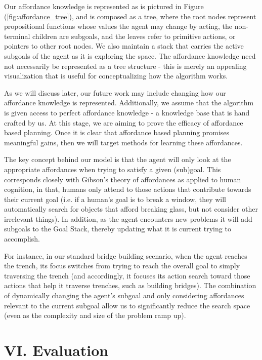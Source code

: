 \documentclass[a4paper]{article}
\begin{document}
Our affordance knowledge is represented as is pictured in Figure (\ref{fig:affordance_tree}), and is composed as a tree, where the root nodes represent propositional functions whose values the agent may change by acting, the non-terminal children are subgoals, and the leaves refer to primitive actions, or pointers to other root nodes. We also maintain a stack that carries the active subgoals of the agent as it is exploring the space. The affordance knowledge need not necessarily be represented as a tree structure - this is merely an appealing visualization that is useful for conceptualizing how the algorithm works.

As we will discuss later, our future work may include changing how our affordance knowledge is represented. Additionally, we assume that the algorithm is given access to perfect affordance knowledge - a knowledge base that is hand crafted by us. At this stage, we are aiming to prove the efficacy of affordance based planning. Once it is clear that affordance based planning promises meaningful gains, then we will target methods for learning these affordances.

The key concept behind our model is that the agent will only look at the appropriate affordances when trying to satisfy a given (sub)goal. This corresponds closely with Gibson's theory of affordances as applied to human cognition, in that, humans only attend to those actions that contribute towards their current goal (i.e. if a human's goal is to break a window, they will automatically search for objects that afford breaking glass, but not consider other irrelevant things). In addition, as the agent encounters new problems it will add subgoals to the Goal Stack, thereby updating what it is current trying to accomplish.

For instance, in our standard bridge building scenario, when the agent reaches the trench, its focus switches from trying to reach the overall goal to simply traversing the trench (and accordingly, it focuses its action search toward those actions that help it traverse trenches, such as building bridges). The combination of dynamically changing the agent's subgoal and only considering affordances relevant to the current subgoal allow us to significantly reduce the search space (even as the complexity and size of the problem ramp up).

\section{VI. Evaluation}
\end{document}
